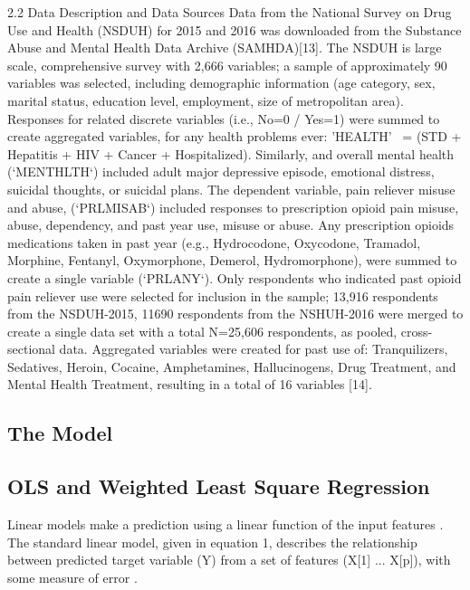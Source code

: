 \documentclass[sigconf]{acmart}
\begin{document}
2.2 Data Description and Data Sources
Data from the National Survey on Drug Use and Health (NSDUH) for 2015 and 2016 was downloaded from the Substance Abuse and Mental Health Data Archive (SAMHDA)[13]. The NSDUH is large scale, comprehensive survey with 2,666 variables; a sample of approximately 90 variables was selected, including demographic information (age category, sex, marital status, education level, employment, size of metropolitan area). Responses for related discrete variables (i.e., No=0 / Yes=1) were summed to create aggregated variables, for any health problems ever: 'HEALTH'  = (STD + Hepatitis + HIV + Cancer + Hospitalized). Similarly, and overall mental health (`MENTHLTH`) included adult major depressive episode, emotional distress, suicidal thoughts, or suicidal plans. 
The dependent variable, pain reliever misuse and abuse, (`PRLMISAB`) included responses to prescription opioid pain misuse, abuse, dependency, and past year use, misuse or abuse. Any prescription opioids medications taken in past year (e.g., Hydrocodone, Oxycodone, Tramadol, Morphine, Fentanyl, Oxymorphone, Demerol, Hydromorphone), were summed to create a single variable (`PRLANY`). Only respondents who indicated past opioid pain reliever use were selected for inclusion in the sample; 13,916 respondents from the NSDUH-2015, 11690 respondents from the NSHUH-2016 were merged to create a single data set with a total N=25,606 respondents, as pooled, cross-sectional data. Aggregated variables were created for past use of: Tranquilizers, Sedatives, Heroin, Cocaine, Amphetamines, Hallucinogens, Drug Treatment, and Mental Health Treatment, resulting in a total of 16 variables [14]. 











 \subsection{The Model}



\subsection{OLS and Weighted Least Square Regression} 

Linear models make a prediction using a linear function of the input features
\cite{muller17}. The standard linear model, given in equation 1, describes the
relationship between predicted target variable (Y) from a set of features 
(X[1] ... X[p]), with some measure of error . 
\end{document}
